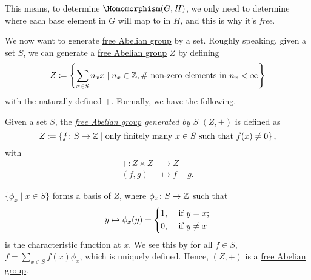 \begin{remark}
	This means, to determine \(\Homomorphism (G, H)\), we only need to determine where each base element in \(G\) will map to in \(H\), and this is why it's \emph{free}.
\end{remark}

\hr

We now want to generate \hyperref[def:free-Abelian-group]{free Abelian group} by a set. Roughly speaking, given a set \(S\), we can generate a \hyperref[def:free-Abelian-group]{free Abelian group} \(Z\)
by defining
\[
	Z\coloneqq \left\{\sum\limits_{x\in S}^{} n_{x} x\mid n_{x} \in \mathbb{\MakeUppercase{z}} , \text{\# non-zero elements in \(n_x < \infty\)}\right\}
\]
with the naturally defined \(+\). Formally, we have the following.

\begin{definition}\label{def:free-Abelian-group-generated-by-sets}
	Given a set \(S\), the \emph{\hyperref[def:free-Abelian-group]{free Abelian group} generated by \(S\)} \((Z, +)\) is defined as
	\[
		Z\coloneqq \left\{f\colon S\to \mathbb{\MakeUppercase{z}} \mid \text{only finitely many \(x\in S\) such that \(f(x)\neq 0\)}\right\},
	\]
	with
	\[
		\begin{split}
			+\colon Z\times Z&\to Z\\
			(f, g)&\mapsto f + g.
		\end{split}
	\]
\end{definition}

\begin{remark}
	\(\{\phi _{x} \mid x\in S\}\) forms a basis of \(Z\), where \(\phi _{x} \colon S\to \mathbb{\MakeUppercase{z}} \) such that
	\[
		y\mapsto \phi _{x} (y) = \begin{dcases}
			1, & \text{ if } y=x ;    \\
			0, & \text{ if } y \neq x
		\end{dcases}
	\]
	is the characteristic function at \(x\). We see this by for all \(f\in S\), \(f = \sum\limits_{x\in S}^{} f(x)\phi _{x} \), which is uniquely defined. Hence, \((Z, +)\) is a \hyperref[def:free-Abelian-group]{free Abelian group}.
\end{remark}

